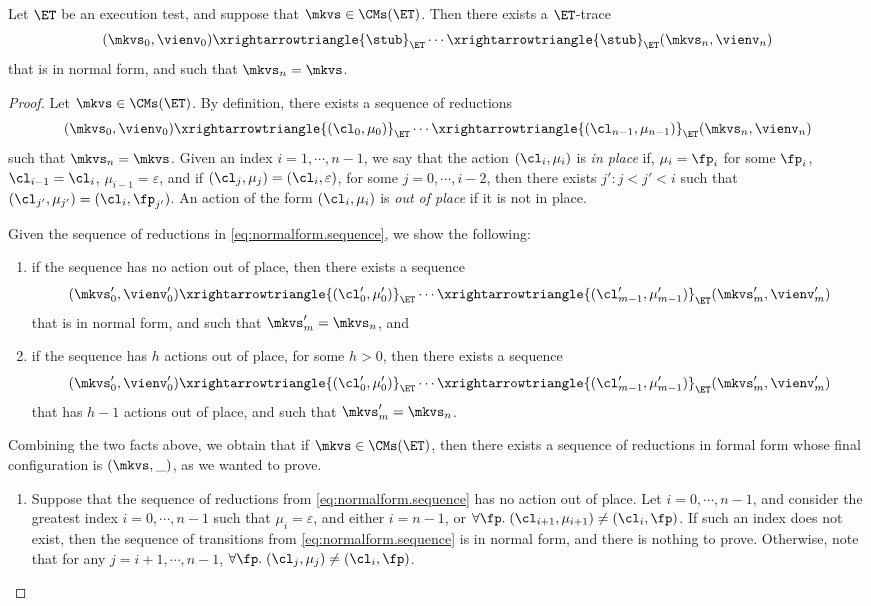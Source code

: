 \begin{proposition}
\label{prop:et.normalform}
Let $\ET$ be an execution test, and suppose that $\mkvs \in \CMs(\ET)$. Then there exists a $\ET$-trace  
\[
(\mkvs_0, \vienv_0) \xrightarrowtriangle{\stub}_{\ET} \cdots \xrightarrowtriangle{\stub}_{\ET} (\mkvs_n, \vienv_{n})
\]
that is in normal form, and such that $\mkvs_{n} = \mkvs$.
\end{proposition}
\begin{proof}
Let $\mkvs \in \CMs(\ET)$. By definition, there exists a sequence of reductions 
\begin{equation}
\label{eq:normalform.sequence}
(\mkvs_{0}, \vienv_{0}) \xrightarrowtriangle{(\cl_0, \mu_0)}_{\ET} \cdots \xrightarrowtriangle{(\cl_{n-1}, \mu_{n-1})}_{\ET} (\mkvs_n, \vienv_{n})
\end{equation}
such that $\mkvs_{n} = \mkvs$. Given an index $i = 1,\cdots, n-1$, we say that the action $(\cl_{i}, \mu_{i})$ is \emph{in place} 
if, $\mu_{i} = \fp_{i}$ for some $\fp_{i}$, $\cl_{i-1} = \cl_{i}$, $\mu_{i-1} = \varepsilon$, and if $(\cl_{j}, \mu_{j}) = (\cl_{i}, \varepsilon)$, 
for some  $j = 0,\cdots, i-2$, then there exists $j': j < j' < i$ such that $(\cl_{j'}, \mu_{j'}) = (\cl_i, \fp_{j'})$. An action of the 
form $(\cl_{i}, \mu_{i})$ is \emph{out of place} if it is not in place. 

Given the sequence of reductions in \cref{eq:normalform.sequence}, we show the following: 
\begin{enumerate}
\item if the sequence has no action out of place, then there exists a sequence 
\[
(\mkvs'_{0}, \vienv'_{0}) \xrightarrowtriangle{(\cl'_{0}, \mu'_{0})}_{\ET} \cdots \xrightarrowtriangle{(\cl'_{m-1}, \mu'_{m-1})}_{\ET} (\mkvs'_{m}, \vienv'_{m})
\]
that is in normal form, and such that $\mkvs'_{m} = \mkvs_{n}$, and 
\item if the sequence has $h$ actions out of place, for some $h > 0$, then there exists a sequence 
\[
(\mkvs'_{0}, \vienv'_{0}) \xrightarrowtriangle{(\cl'_{0}, \mu'_{0})}_{\ET} \cdots \xrightarrowtriangle{(\cl'_{m-1}, \mu'_{m-1})}_{\ET} (\mkvs'_{m}, \vienv'_{m})
\]
that has $h-1$ actions out of place, and such that $\mkvs'_{m} = \mkvs_{n}$.
\end{enumerate}
Combining the two facts above, we obtain that if $\mkvs \in \CMs(\ET)$, then there exists a sequence of reductions in formal form whose final 
configuration is $(\mkvs, \_)$, as we wanted to prove.

\begin{enumerate}
\item 
Suppose that the sequence of reductions from \cref{eq:normalform.sequence} has no action out of place. 
Let $i=0,\cdots, n-1$, and consider the greatest index $i=0,\cdots, n-1$ such that  
$\mu_{i} = \varepsilon$, and either $i = n-1$, or 
$\forall \fp.\; (\cl_{i+1}, \mu_{i+1}) \neq (\cl_{i}, \fp)$. 
If such an index does not exist, then the sequence of transitions from \cref{eq:normalform.sequence} is in 
normal form, and there is nothing to prove. Otherwise, note that for any $j = i+1,\cdots, n-1$, 
$\forall \fp.\;(\cl_{j}, \mu_{j}) \neq (\cl_{i}, \fp)$. 


\end{enumerate}
\end{proof}
